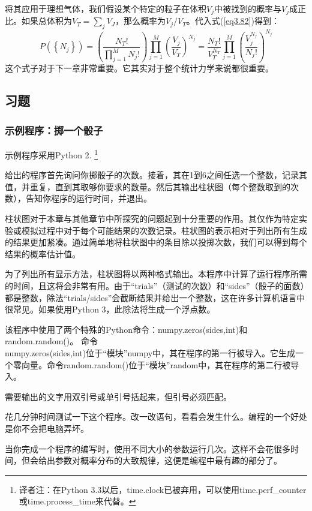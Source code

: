 \documentclass[UTF8]{ctexart}
\numberwithin{equation}{section}%
\numberwithin{figure}{section}%
\begin{document}
    将其应用于理想气体，我们假设某个特定的粒子在体积$V_j$中被找到的概率与$V_j$成正比。如果总体积为$V_T=\sum_jV_J$，那么概率为$V_j/V_T$。代入式(\ref{eq3.82})得到：
    \begin{equation}\label{eq3.83}
        P\left(\left\{N_{j}\right\}\right)=\left(\frac{N_{T} !}{\prod_{j=1}^{M} N_{j} !}\right) \prod_{j=1}^{M}\left(\frac{V_{j}}{V_{T}}\right)^{N_{j}}=\frac{N_{T} !}{V_{T}^{N_{T}}} \prod_{j=1}^{M}\left(\frac{V_{j}^{N_{j}}}{N_{j} !}\right)^{N_{j}}
    \end{equation}
    这个式子对于下一章非常重要。它其实对于整个统计力学来说都很重要。
    \subsection{习题}
    \subsubsection*{示例程序：掷一个骰子}
    示例程序采用Python 2. \footnote{译者注：在Python 3.3以后，time.clock已被弃用，可以使用time.perf\_counter或time.process\_time来代替。}

    给出的程序首先询问你掷骰子的次数。接着，其在1到6之间任选一个整数，记录其值，并重复，直到其取够你要求的数量。然后其输出柱状图（每个整数取到的次数），告知你程序的运行时间，并退出。

    柱状图对于本章与其他章节中所探究的问题起到十分重要的作用。其仅作为特定实验或模拟过程中对于每个可能结果的次数记录。柱状图的表示相对于列出所有生成的结果更加紧凑。通过简单地将柱状图中的条目除以投掷次数，我们可以得到每个结果的概率估计值。
    
    为了列出所有显示方法，柱状图将以两种格式输出。本程序中计算了运行程序所需的时间，且这将会非常有用。由于“trials”（测试的次数）和“sides”（骰子的面数）都是整数，除法“trials/sides”会截断结果并给出一个整数，这在许多计算机语言中很常见。如果使用Python 3，此除法将生成一个浮点数。
    
    该程序中使用了两个特殊的Python命令：numpy.zeros(sides,int)和random.random()。
    命令\\numpy.zeros(sides,int)位于“模块”numpy中，其在程序的第一行被导入。它生成一个零向量。命令random.random()位于“模块”random中，其在程序的第二行被导入。

    需要输出的文字用双引号或单引号括起来，但引号必须匹配。

    花几分钟时间测试一下这个程序。改一改语句，看看会发生什么。编程的一个好处是你不会把电脑弄坏。

    当你完成一个程序的编写时，使用不同大小的参数运行几次。这样不会花很多时间，但会给出参数对概率分布的大致规律，这便是编程中最有趣的部分了。
\end{document}

